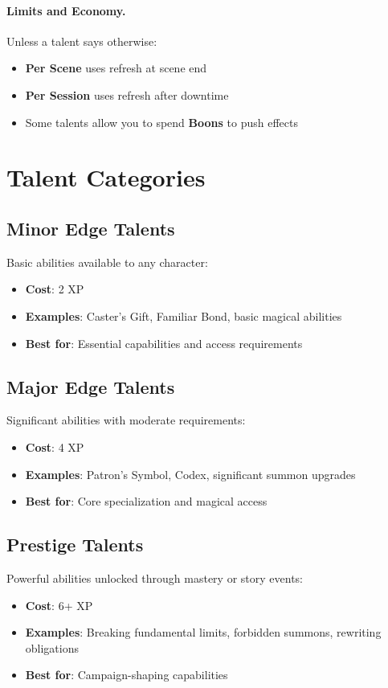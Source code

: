 \paragraph{Limits and Economy.}
Unless a talent says otherwise:
\begin{itemize}
\item \textbf{Per Scene} uses refresh at scene end
\item \textbf{Per Session} uses refresh after downtime
\item Some talents allow you to spend \textbf{Boons} to push effects
\end{itemize}

\section{Talent Categories}

\subsection*{Minor Edge Talents}
Basic abilities available to any character:
\begin{itemize}
\item \textbf{Cost}: 2 XP
\item \textbf{Examples}: Caster's Gift, Familiar Bond, basic magical abilities
\item \textbf{Best for}: Essential capabilities and access requirements
\end{itemize}

\subsection*{Major Edge Talents}
Significant abilities with moderate requirements:
\begin{itemize}
\item \textbf{Cost}: 4 XP
\item \textbf{Examples}: Patron's Symbol, Codex, significant summon upgrades
\item \textbf{Best for}: Core specialization and magical access
\end{itemize}

\subsection*{Prestige Talents}
Powerful abilities unlocked through mastery or story events:
\begin{itemize}
\item \textbf{Cost}: 6+ XP
\item \textbf{Examples}: Breaking fundamental limits, forbidden summons, rewriting obligations
\item \textbf{Best for}: Campaign-shaping capabilities
\end{itemize}

